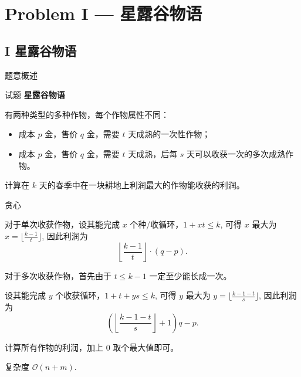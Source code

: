 \documentclass{beamer}
\newcommand{\TT}[1] {{\ttfamily #1}}
\newcommand{\BF}[1] {\textbf{#1}}
\begin{document}
{

\section[I]{Problem I — 星露谷物语}
\subsection{I 星露谷物语}

\begin{frame}{题意概述}

\begin{center}
试题 \myboxix{      \BF{\TT{I}}} \BF{星露谷物语}
\end{center}
有两种类型的多种作物，每个作物属性不同：

\begin{itemize}
  \item 成本 $p$ 金，售价 $q$ 金，需要 $t$ 天成熟的一次性作物；
  \item 成本 $p$ 金，售价 $q$ 金，需要 $t$ 天成熟，后每 $s$ 天可以收获一次的多次成熟作物。
\end{itemize}

计算在 $k$ 天的春季中在一块耕地上利润最大的作物能收获的利润。

\end{frame}


\begin{frame}{贪心}

对于单次收获作物，设其能完成 $x$ 个种/收循环，$1 + xt \le k$, 可得 $x$ 最大为 $x = \lfloor \frac{k - 1}{t} \rfloor$, 因此利润为 \[\left\lfloor\frac{k - 1}{t}\right\rfloor \cdot (q - p).\]

对于多次收获作物，首先由于 $t \le k - 1$ 一定至少能长成一次。

设其能完成 $y$ 个收获循环，$1 + t + ys \le k$, 可得 $y$ 最大为 $y = \lfloor \frac{k - 1 - t}{s} \rfloor$, 因此利润为 \[\left(\left\lfloor \frac{k - 1 - t}{s} \right\rfloor + 1 \right)q - p.\]

计算所有作物的利润，加上 $0$ 取个最大值即可。

复杂度 $\mathcal{O}(n + m)$.

\end{frame}

}
\end{document}
